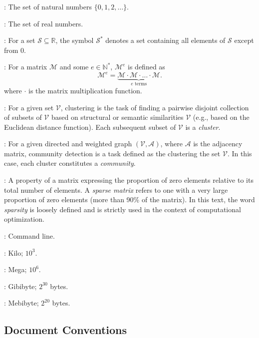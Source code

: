 \documentclass[a4paper,12pt]{extarticle}
\begin{document}
  \begin{description}[leftmargin=1.2em]
    \item[\(\mathbb{N}\)]: The set of natural numbers \(\{ 0, 1, 2, \dots  \}\).
    \item[\(\mathbb{R}\)]: The set of real numbers.
    \item[\(\mathscr{S}^*\)]: For a set \(\mathscr{S} \subseteq \mathbb{R}\), the symbol \(\mathscr{S}^*\) denotes a set containing all elements of \(\mathscr{S}\) except from \(0\).
    \item[\(\mathcal{M}^e\)]: For a matrix \(\mathcal{M}\) and some \(e \in \mathbb{N}^*\), \(\mathcal{M}^e\) is defined as
    \[
      \mathcal{M}^e = \underbrace{\mathcal{M} \cdot \mathcal{M} \cdot \hdots \cdot \mathcal{M}}_{e \text{ terms}} .
    \]
    where \(\cdot\) is the matrix multiplication function.
    \item[Clustering]: For a given set \(\mathscr{V}\), clustering is the task of finding a pairwise disjoint collection of subsets of \(\mathscr{V}\) based on structural or semantic similarities \(\mathscr{V}\) (e.g., based on the Euclidean distance function). Each subsequent subset of \(\mathscr{V}\) is a \textit{cluster}.
    \item[Community Detection]: For a given directed and weighted graph \( (\mathscr{V}, \mathcal{A}) \), where \( \mathcal{A} \) is the adjacency matrix, community detection is a task defined as the clustering the set \(\mathscr{V}\). In this case, each cluster constitutes a \textit{community}.
    \item[Sparsity]: A property of a matrix expressing the proportion of zero elements relative to its total number of elements. A \textit{sparse matrix} refers to one with a very large proportion of zero elements (more than 90\% of the matrix). In this text, the word \textit{sparsity} is loosely defined and is strictly used in the context of computational optimization.
    \item[CLI]: Command line.
    \item[Units]: Kilo; \(10^3\).
    \item[M]: Mega; \(10^6\).
    \item[GiB]: Gibibyte; \(2^{30}\) bytes.
    \item[MiB]: Mebibyte; \(2^{20}\) bytes.
  \end{description}

  
  \subsection*{%
    \centering Document Conventions
  }
\end{document}
